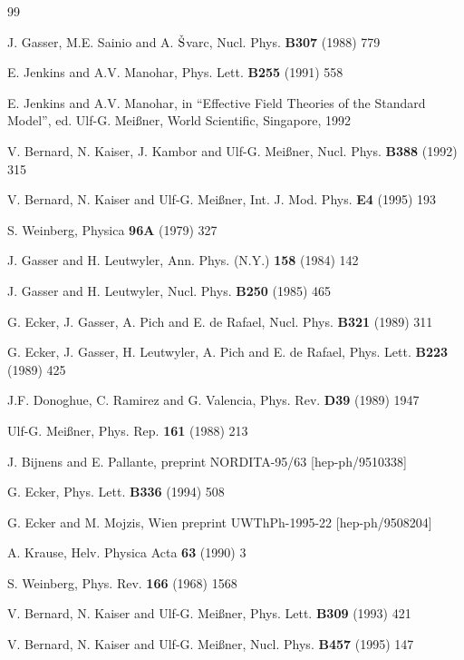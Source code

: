 \begin{thebibliography}{99}

 J. Gasser, M.E. Sainio and A. ${\rm \check{S}}$varc,
Nucl. Phys.  {\bf B307} (1988) 779

 E. Jenkins and A.V. Manohar, Phys. Lett. {\bf B255} (1991) 558

 E. Jenkins and A.V. Manohar, in ``Effective Field
Theories of the Standard Model'', ed. Ulf-G. Mei{\ss}ner, World
Scientific, Singapore, 1992

V. Bernard, N. Kaiser, J. Kambor and Ulf-G. Mei\ss ner, Nucl. Phys.
{\bf B388} (1992) 315

 V. Bernard, N. Kaiser and Ulf-G. Mei{\ss}ner,
Int. J. Mod. Phys. {\bf E4} (1995) 193

 S. Weinberg, Physica {\bf 96A} (1979) 327

 J. Gasser and H. Leutwyler, Ann. Phys. (N.Y.)
                {\bf 158} (1984) 142

 J. Gasser and H. Leutwyler, Nucl. Phys. {\bf B250} (1985) 465

 G. Ecker, J. Gasser, A. Pich and E. de Rafael,
Nucl. Phys. {\bf B321} (1989) 311

G. Ecker, J. Gasser, H. Leutwyler, A. Pich and E. de Rafael,
Phys. Lett. {\bf B223} (1989) 425

 J.F. Donoghue, C. Ramirez and
G. Valencia, Phys. Rev. {\bf D39} (1989) 1947

 Ulf-G. Mei{\ss}ner, Phys. Rep. {\bf 161} (1988) 213

 J. Bijnens and E. Pallante, preprint NORDITA-95/63
[hep-ph/9510338]

 G. Ecker, Phys. Lett. {\bf B336} (1994) 508

 G. Ecker and M. Mojzis, Wien preprint UWThPh-1995-22
                 [hep-ph/9508204]

 A. Krause, Helv. Physica Acta  {\bf 63} (1990) 3

 S. Weinberg, Phys. Rev. {\bf 166} (1968) 1568

 V. Bernard, N. Kaiser and Ulf-G. Mei\ss ner,
Phys. Lett.  {\bf B309} (1993) 421

 V. Bernard, N. Kaiser and Ulf-G. Mei\ss ner,
Nucl. Phys. {\bf B457} (1995) 147


\end{thebibliography}
